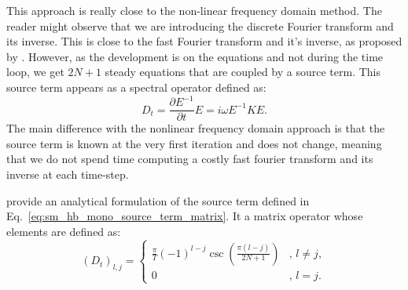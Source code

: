 This approach is really close to the non-linear frequency domain method.
The reader might observe that we are introducing the discrete Fourier
transform and its inverse. This is close to the fast Fourier transform
and it's inverse, as proposed by \citet{McMullen2001}. However,
as the development is on the equations and not during the time loop,
we get $2N+1$ steady equations that are coupled by a source term.
This source term appears as a spectral operator defined as:
\begin{equation}
	D_t = \frac{\partial E^{-1}}{\partial t} E = i \omega E^{-1} K E.
	\label{eq:sm_hb_mono_source_term_matrix}
\end{equation}
The main difference with the nonlinear frequency domain approach
is that the source term is known at the very first iteration and does
not change, meaning that we do not spend time computing a costly
fast fourier transform and its inverse at each time-step.

\citet{Gopinath2005} provide an analytical formulation of the
source term defined in Eq.~\ref{eq:sm_hb_mono_source_term_matrix}.
It a matrix operator whose elements are defined as:
\begin{equation}
  (D_t)_{l, j} =
  \begin{cases}
    \frac{\pi}{T}(-1)^{l-j}\csc\left(\frac{\pi
        (l-j)}{2N+1}\right) &, \, l\neq j,\\
    0 &, \, l=j.
  \end{cases}
\end{equation}
